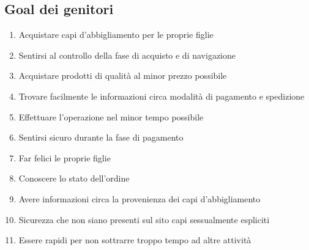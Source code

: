 \documentclass[12pt,a4paper]{report}
\begin{document}
\subsection*{Goal dei genitori}
\begin{enumerate}
  \item Acquistare capi d'abbigliamento per le proprie figlie
  \item Sentirsi al controllo della fase di acquisto e di navigazione
  \item Acquistare prodotti di qualità al minor prezzo possibile
  \item Trovare facilmente le informazioni circa modalità di pagamento e spedizione
  \item Effettuare l'operazione nel minor tempo possibile
  \item Sentirsi sicuro durante la fase di pagamento
  \item Far felici le proprie figlie
  \item Conoscere lo stato dell'ordine
  \item Avere informazioni circa la provenienza dei capi d'abbigliamento
  \item Sicurezza che non siano presenti sul sito capi sessualmente espliciti
  \item Essere rapidi per non sottrarre troppo tempo ad altre attività
\end{enumerate}
\end{document}
